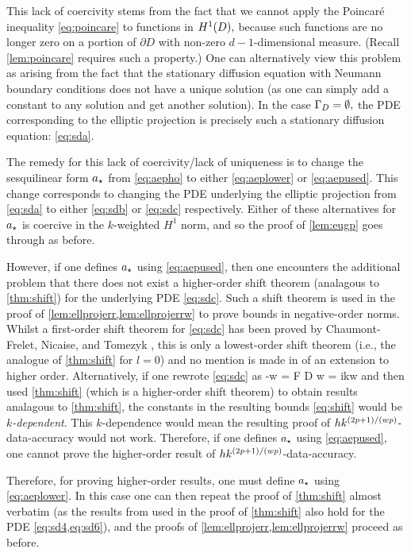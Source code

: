 This lack of coercivity stems from the fact that we cannot apply the Poincar\'e inequality \cref{eq:poincare} to functions in $\HoD,$ because such functions are no longer zero on a portion of $\partial D$ with non-zero $d-1$-dimensional measure. (Recall \cref{lem:poincare} requires such a property.) One can alternatively view this problem as arising from the fact that the stationary diffusion equation with Neumann boundary conditions does not have a unique solution (as one can simply add a constant to any solution and get another solution). In the case $\Gamma_{D}=\emptyset,$ the PDE corresponding to the elliptic projection is precisely such a stationary diffusion equation: \cref{eq:sda}.

The remedy for this lack of coercivity/lack of uniqueness is to change the sesquilinear form $a_{\star}$ from \cref{eq:aepho} to either \cref{eq:aeplower} or \cref{eq:aepused}. This change corresponds to changing the PDE underlying the elliptic projection from \cref{eq:sda} to either \cref{eq:sdb} or \cref{eq:sdc} respectively. Either of these alternatives for $a_{\star}$ is coercive in the $k$-weighted $H^1$ norm, and so the proof of \cref{lem:eugp} goes through as before.

However, if one defines $a_{\star}$ using \cref{eq:aepused}, then one encounters the additional problem that there does not exist a higher-order shift theorem (analagous to \cref{thm:shift}) for the underlying PDE \cref{eq:sdc}. Such a shift theorem is used in the proof of \cref{lem:ellprojerr,lem:ellprojerrw} to prove bounds in negative-order norms. Whilst a first-order shift theorem for \cref{eq:sdc}  has been proved by Chaumont-Frelet, Nicaise, and Tomezyk \cite[Theorems 3.1, 4.3, and 5.1]{ChNiTo:18}, this is only a lowest-order shift theorem (i.e., the analogue of \cref{thm:shift} for $l=0$) and no mention is made in \cite{ChNiTo:18} of an extension to higher order. Alternatively, if one rewrote \cref{eq:sdc} as
\beqs
-\Delta w = F  \tin D \tand
\eeqs
\beqs
\dn w = ikw \ton \GI
\eeqs
and then used \cref{thm:shift} (which is a higher-order shift theorem) to obtain results analagous to \cref{thm:shift}, the constants in the resulting bounds \cref{eq:shift} would be \emph{$k$-dependent}. This $k$-dependence would mean the resulting proof of $hk^{(2p+1)/(wp)}$-data-accuracy would not work. Therefore, if one defines $a_{\star}$ using \cref{eq:aepused}, one cannot prove the higher-order result of $hk^{(2p+1)/(wp)}$-data-accuracy.

Therefore, for proving higher-order results, one must define $a_{\star}$ using \cref{eq:aeplower}. In this case one can then repeat the proof of \cref{thm:shift} almost verbatim (as the results from \cite{Mc:00} used in the proof of \cref{thm:shift} also hold for the PDE \cref{eq:sd4,eq:sd6}), and the proofs of \cref{lem:ellprojerr,lem:ellprojerrw} proceed as before.

